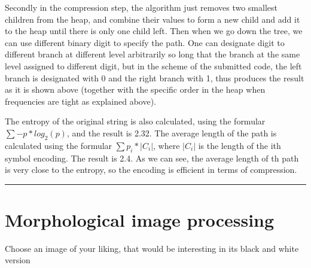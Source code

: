 \documentclass[conference]{styles/acmsiggraph}
\newenvironment{answer}{}{}
\begin{document}
\begin{answer}
	Secondly in the compression step, the algorithm just removes two smallest children from the heap, and combine their values to form a new child and add it to the heap until there is only one child left. Then when we go down the tree, we can use different binary digit to specify the path. One can designate digit to different branch at different level arbitrarily so long that the branch at the same level assigned to different digit, but in the scheme of the submitted code, the left branch is designated with 0 and the right branch with 1, thus produces the result as it is shown above (together with the specific order in the heap when frequencies are tight as explained above).

	The entropy of the original string is also calculated, using the formular $\sum -p * log_2(p)$, and the result is 2.32. The average length of the path is calculated using the formular $\sum p_i* |C_i|$, where $|C_i|$ is the length of the ith symbol encoding. The result is 2.4. As we can see, the average length of th path is very close to the entropy, so the encoding is efficient in terms of compression.
		
\rule{\textwidth}{0.4pt}
\end{answer}

\section{Morphological image processing}
Choose an image of your liking, that would be interesting in its black and white version
\end{document}

